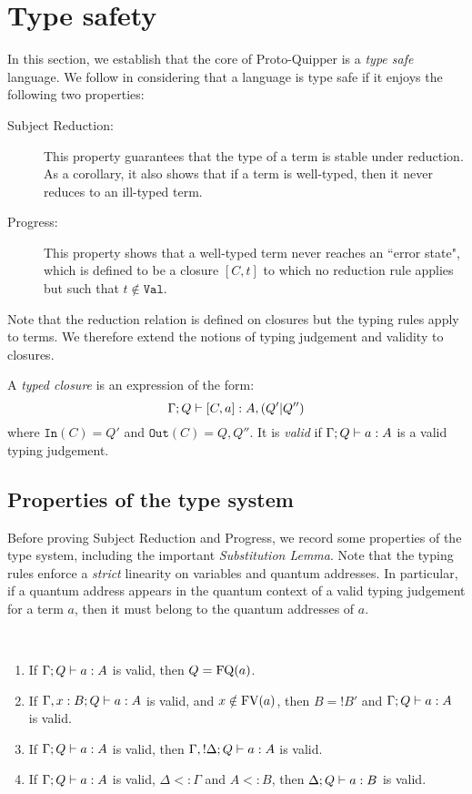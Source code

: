 \documentclass[twoside]{article}
\begin{document}
\section{Type safety}\label{sec-type-safety}

In this section, we establish that the core of  Proto-Quipper 
is a \emph{type safe} language. We follow \cite{WrFe94} in 
considering that a language is type safe if it enjoys the 
following two properties: 
\begin{description}
  \item[Subject Reduction:] This property guarantees 
  that the type of a term is stable under reduction.
  As a corollary, it also shows that if a term is 
  well-typed, then it never reduces to an ill-typed 
  term.
  \item[Progress:] This property shows that a 
  well-typed term never reaches an ``error state", 
  which is defined to be a closure $[C,t]$ to which 
  no reduction rule applies but such that 
  $t\notin \mathtt{Val}$. 
\end{description}
Note that the reduction relation is defined on closures 
but the typing rules apply to terms. We therefore extend 
the notions of typing judgement and validity to closures.

\begin{definition}
A \emph{typed closure} is an expression of the form:
\[
\Gamma;Q\vdash [C,a]:A,(Q'|Q'')
\]
where $\mathtt{In}(C)=Q'$ and $\mathtt{Out}(C)=Q,Q''$. 
It is \emph{valid} if $\Gamma;Q\vdash a:A$ is a valid 
typing judgement.
\end{definition}

\subsection{Properties of the type system}

Before proving Subject Reduction and Progress, we record 
some properties of the type system, including the important 
\emph{Substitution Lemma}. Note that the typing rules 
enforce a \emph{strict} linearity on variables and quantum 
addresses. In particular, if a quantum address appears in 
the quantum context of a valid typing judgement for a term 
$a$, then it must belong to the quantum addresses of $a$.

\begin{lemma}~
\label{prop_type_syst}
\begin{enumerate}
  \item If $\Gamma; Q \vdash a:A$ is valid, 
  then $Q=\mathop{\textrm{FQ}}\nolimits(a)$.\label{q_context}
  \item If $\Gamma,x:B;Q \vdash a:A$ is valid, 
  and $x\notin \mathop{\textrm{FV}}\nolimits(a)$, then $B=!B'$ and 
  $\Gamma;Q \vdash a:A$ is valid.\label{unused_var}
  \item If $\Gamma; Q \vdash a:A$ is valid, 
  then $\Gamma, !\Delta ; Q \vdash a:A$ is valid.\label{weakening}
  \item If $\Gamma ; Q \vdash a:A$ is valid, $\Delta <: \Gamma$
  and $A<:B$, then $\Delta ; Q \vdash a:B$ is valid.\label{subtype}
\end{enumerate}
\end{lemma}
\end{document}
